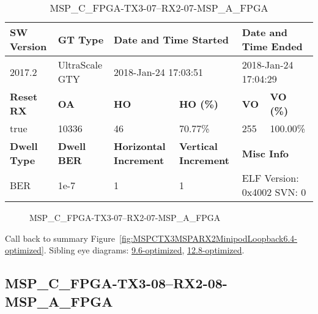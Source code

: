 \begin{table}[h]
\centering
\caption{MSP\_C\_FPGA-TX3-07--RX2-07-MSP\_A\_FPGA}
\label{tab:MSPCFPGATX307RX207MSPAFPGA6.4-optimized}
\begin{tabular}{@{}|l|l|l|l|l|l|@{}}
\toprule
\textbf{SW Version}                & \textbf{GT Type}   & \multicolumn{2}{l|}{\textbf{Date and Time Started}}            & \multicolumn{2}{l|}{\textbf{Date and Time Ended}}        \\ \midrule
2017.2                       & UltraScale GTY          & \multicolumn{2}{l|}{2018-Jan-24 17:03:51}                   & \multicolumn{2}{l|}{2018-Jan-24 17:04:29}               \\ \midrule
\textbf{Reset RX}                  & \textbf{OA} & \textbf{HO}   & \textbf{HO (\%)} & \textbf{VO} & \textbf{VO (\%)} \\ \midrule
true & 10336        & 46          & 70.77\%        & 255        & 100.00\%       \\ \midrule
\textbf{Dwell Type}                & \textbf{Dwell BER} & \textbf{Horizontal Increment} & \textbf{Vertical Increment}    & \multicolumn{2}{l|}{\textbf{Misc Info}}                  \\ \midrule
BER                            & 1e-7        & 1        & 1           & \multicolumn{2}{l|}{ELF Version: 0x4002 SVN: 0}                         \\ \bottomrule
\end{tabular}
\end{table}

\begin{figure}[h]
\caption{MSP\_C\_FPGA-TX3-07--RX2-07-MSP\_A\_FPGA} \label{fig:MSPCFPGATX307RX207MSPAFPGA6.4-optimized}
\end{figure}

Call back to summary Figure~\ref{fig:MSPCTX3MSPARX2MinipodLoopback6.4-optimized}.
Sibling eye diagrams: \hyperref[sec:MSPCFPGATX307RX207MSPAFPGA9.6-optimized]{9.6-optimized}, \hyperref[sec:MSPCFPGATX307RX207MSPAFPGA12.8-optimized]{12.8-optimized}.

\clearpage
\newpage


\subsection{MSP\_C\_FPGA-TX3-08--RX2-08-MSP\_A\_FPGA}\label{sec:MSPCFPGATX308RX208MSPAFPGA6.4-optimized}

